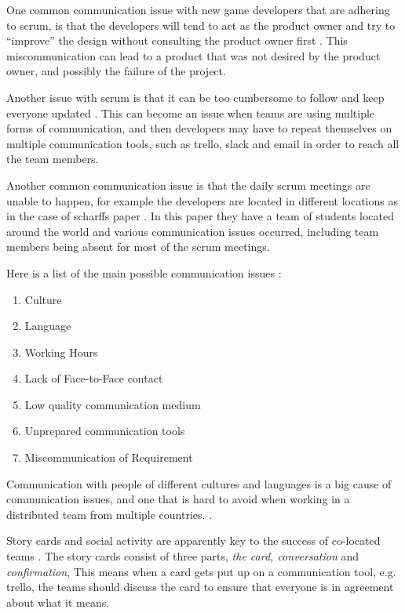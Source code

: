 \documentclass{scrartcl}
\begin{document}
One common communication issue with new game developers that are adhering to scrum, is that the developers will tend to act as the product owner and try to ``improve'' the design without consulting the product owner first \cite{krasteva2008}. This miscommunication can lead to a product that was not desired by the product owner, and possibly the failure of the project. \par



Another issue with scrum is that it can be too cumbersome to follow and keep everyone updated \cite{scharff2012}. This can become an issue when teams are using multiple forms of communication, and then developers may have to repeat themselves on multiple communication tools, such as trello, slack and email in order to reach all the team members. \par

Another common communication issue is that the daily scrum meetings are unable to happen, for example the developers are located in different locations as in the case of scharffs paper \cite{scharff2012}. In this paper they have a team of students located around the world and various communication issues occurred, including team members being absent for most of the scrum meetings. 

Here is a list of the main possible communication issues \cite{joshi2013}: 

\begin{enumerate}
\item Culture
\item Language
\item Working Hours
\item Lack of Face-to-Face contact
\item Low quality communication medium
\item Unprepared communication tools
\item Miscommunication of Requirement
\end{enumerate}

Communication with people of different cultures and languages is a big cause of communication issues, and one that is hard to avoid when working in a distributed team from multiple countries. \cite{cohn2003}.

Story cards and social activity are apparently key to the success of co-located teams \cite{abdullah2011}. The story cards consist of three parts, \textit{the card, conversation} and \textit{confirmation}, This means when a card gets put up on a communication tool, e.g. trello, the teams should discuss the card to ensure that everyone is in agreement about what it means. \par
\end{document}
